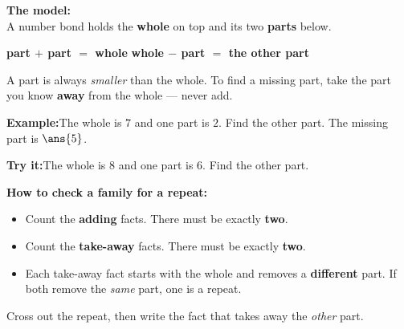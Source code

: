 \documentclass[12pt]{article}
\begin{document}


\begin{formulabox}
\textbf{The model:}\\[4pt]
A number bond holds the \textbf{whole} on top and its two \textbf{parts} below.
\begin{center}
\end{center}
\textbf{part $+$ part $=$ whole} \qquad \textbf{whole $-$ part $=$ the other part}\par
\smallskip
A part is always \emph{smaller} than the whole. To find a missing part, take the
part you know \textbf{away} from the whole --- never add.
\end{formulabox}

\begin{examplebox}
\textbf{Example:}\quad The whole is $7$ and one part is $2$. Find the other part.
The missing part is $\ans{5}$.
\end{examplebox}

\begin{tryitbox}
\textbf{Try it:}\quad The whole is $8$ and one part is $6$. Find the other part.\\[2pt]
\end{tryitbox}


\begin{formulabox}
\textbf{How to check a family for a repeat:}
\begin{itemize}[leftmargin=0.8cm, itemsep=1pt, topsep=2pt]
  \item Count the \textbf{adding} facts. There must be exactly \textbf{two}.
  \item Count the \textbf{take-away} facts. There must be exactly \textbf{two}.
  \item Each take-away fact starts with the whole and removes a \textbf{different}
        part. If both remove the \emph{same} part, one is a repeat.
\end{itemize}
Cross out the repeat, then write the fact that takes away the \emph{other} part.
\end{formulabox}
\end{document}

